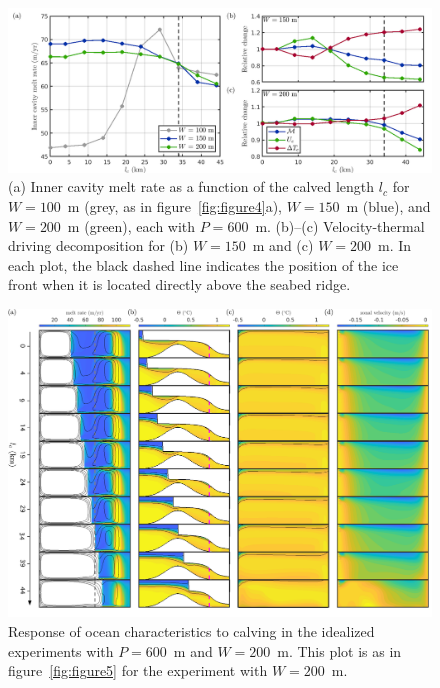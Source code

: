 \documentclass[draft]{agujournal2019}
\begin{document}
\begin{figure}
    \centering
    \includegraphics[width =
    \textwidth]{plots/figure6.png}
    \caption{(a) Inner cavity melt rate as a function of the calved length $l_c$ for $W=100$~m (grey, as in figure~\ref{fig:figure4}a), $W=150$~m (blue), and $W=200$~m (green), each with $P = 600$~m.  (b)--(c) Velocity-thermal driving decomposition for (b) $W = 150$~m and (c) $W = 200$~m. In each plot, the black dashed line indicates the position of the ice front when it is located directly above the seabed ridge.}
    \label{fig:figure6}
\end{figure}

\begin{figure}
    \centering
    \includegraphics[width = \textwidth]{plots/figure7.pdf}
    \caption{Response of ocean characteristics to calving in the idealized experiments with $P=600$~m and $W=200$~m. This plot is as in figure~\ref{fig:figure5} for the experiment with $W=200$~m.}
    \label{fig:figure7}
\end{figure}
\end{document}
